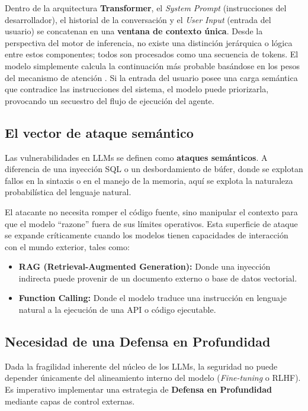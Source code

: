 \documentclass[12pt]{article}
\begin{document}
Dentro de la arquitectura \textbf{Transformer}, el \textit{System Prompt} (instrucciones del desarrollador), el historial de la conversación y el \textit{User Input} (entrada del usuario) se concatenan en una \textbf{ventana de contexto única}. Desde la perspectiva del motor de inferencia, no existe una distinción jerárquica o lógica entre estos componentes; todos son procesados como una secuencia de tokens. El modelo simplemente calcula la continuación más probable basándose en los pesos del mecanismo de atención \parencite{vaswani2017attention}. Si la entrada del usuario posee una carga semántica que contradice las instrucciones del sistema, el modelo puede priorizarla, provocando un secuestro del flujo de ejecución del agente.

\subsection{El vector de ataque semántico}
Las vulnerabilidades en LLMs se definen como \textbf{ataques semánticos}. A diferencia de una inyección SQL o un desbordamiento de búfer, donde se explotan fallos en la sintaxis o en el manejo de la memoria, aquí se explota la naturaleza probabilística del lenguaje natural.

El atacante no necesita romper el código fuente, sino manipular el contexto para que el modelo ``razone'' fuera de sus límites operativos. Esta superficie de ataque se expande críticamente cuando los modelos tienen capacidades de interacción con el mundo exterior, tales como:
\begin{itemize}
    \item \textbf{RAG (Retrieval-Augmented Generation):} Donde una inyección indirecta puede provenir de un documento externo o base de datos vectorial.
    \item \textbf{Function Calling:} Donde el modelo traduce una instrucción en lenguaje natural a la ejecución de una API o código ejecutable.
\end{itemize}

\subsection{Necesidad de una Defensa en Profundidad}
Dada la fragilidad inherente del núcleo de los LLMs, la seguridad no puede depender únicamente del alineamiento interno del modelo (\textit{Fine-tuning} o RLHF). Es imperativo implementar una estrategia de \textbf{Defensa en Profundidad} mediante capas de control externas.
\end{document}
